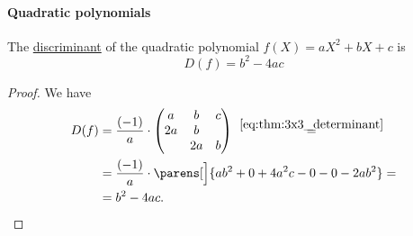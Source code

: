 \paragraph{Quadratic polynomials}

\begin{lemma}\label{thm:quadratic_polynomial_discriminant}
  The \hyperref[def:discriminant]{discriminant} of the quadratic polynomial \( f(X) = a X^2 + b X + c \) is
  \begin{equation}\label{eq:thm:quadratic_polynomial_discriminant}
    D(f) = b^2 - 4ac
  \end{equation}
\end{lemma}
\begin{proof}
  We have
  \begin{align*}
    D(f)
    &=
    \frac {(-1)} a \cdot \begin{pmatrix}
      a  & b  & c  \\
      2a & b  &    \\
         & 2a & b
    \end{pmatrix}
    \reloset {\eqref{eq:thm:3x3_determinant}} = \\ &=
    \frac {(-1)} a \cdot \parens[\Big]{ ab^2 + 0 + 4a^2c - 0 - 0 - 2ab^2 }
    = \\ &=
    b^2 - 4ac.
  \end{align*}
\end{proof}

